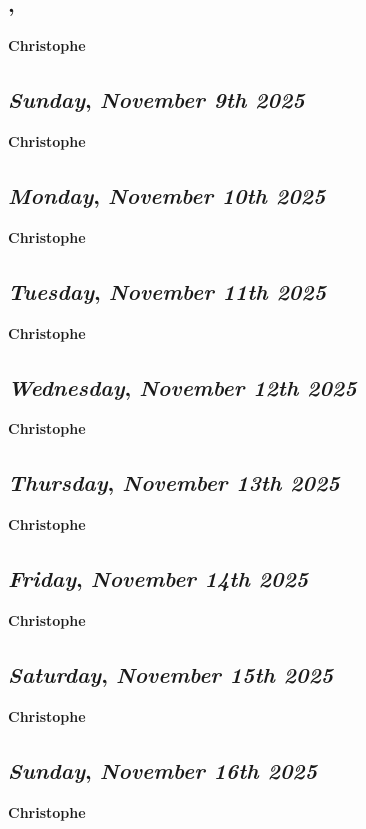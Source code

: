 \subsection*{\weekday, \day}
\textbf {Christophe}

\def\day{\textit{November 9th 2025}}
\def\weekday{\textit{Sunday}}
\subsection*{\weekday, \day}
\textbf {Christophe}

\def\day{\textit{November 10th 2025}}
\def\weekday{\textit{Monday}}
\subsection*{\weekday, \day}
\textbf {Christophe}

\def\day{\textit{November 11th 2025}}
\def\weekday{\textit{Tuesday}}
\subsection*{\weekday, \day}
\textbf {Christophe}

\def\day{\textit{November 12th 2025}}
\def\weekday{\textit{Wednesday}}
\subsection*{\weekday, \day}
\textbf {Christophe}

\def\day{\textit{November 13th 2025}}
\def\weekday{\textit{Thursday}}
\subsection*{\weekday, \day}
\textbf {Christophe}

\def\day{\textit{November 14th 2025}}
\def\weekday{\textit{Friday}}
\subsection*{\weekday, \day}
\textbf {Christophe}

\def\day{\textit{November 15th 2025}}
\def\weekday{\textit{Saturday}}
\subsection*{\weekday, \day}
\textbf {Christophe}

\def\day{\textit{November 16th 2025}}
\def\weekday{\textit{Sunday}}
\subsection*{\weekday, \day}
\textbf {Christophe}

